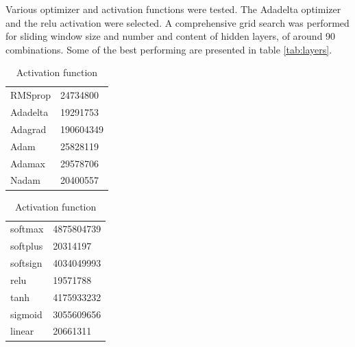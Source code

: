 \documentclass[12pt]{article}
\begin{document}
  Various optimizer and activation functions were tested. The Adadelta optimizer and the 
  relu activation were selected. A comprehensive grid search was performed for sliding window size and number 
  and content of hidden layers, of around 90 combinations. Some of the best performing are presented 
  in table \ref{tab:layers}.

  \begin{table}[!htb]
    \caption{Selecting optimizer and activation. Scores are averaged MSE.}
    \begin{minipage}{.5\linewidth}
      \caption*{Optimizer}
      \centering
        \begin{tabular}{ll}
            RMSprop & 24734800\\
            Adadelta & 19291753\\
            Adagrad & 190604349\\
            Adam & 25828119\\
            Adamax & 29578706\\
            Nadam & 20400557
        \end{tabular}
    \end{minipage}%
    \begin{minipage}{.5\linewidth}
      \centering
        \caption*{Activation function}
        \begin{tabular}{ll}
            softmax & 4875804739\\
            softplus & 20314197\\
            softsign & 4034049993\\
            relu & 19571788\\
            tanh & 4175933232\\
            sigmoid & 3055609656\\
            linear & 20661311
        \end{tabular}
    \end{minipage}
  \end{table}
\end{document}
